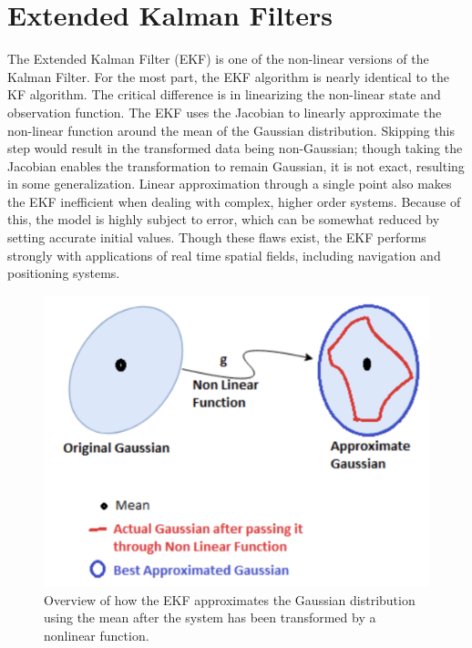 \chapter{Extended Kalman Filters}
\label{Extended Kalman Filters}

The Extended Kalman Filter (EKF) is one of the non-linear versions of the Kalman Filter. For the most part, the EKF algorithm is nearly identical to the KF algorithm. The critical difference is in linearizing the non-linear state and observation function. The EKF uses the Jacobian to linearly approximate the non-linear function around the mean of the Gaussian distribution. Skipping this step would result in the transformed data being non-Gaussian; though taking the Jacobian enables the transformation to remain Gaussian, it is not exact, resulting in some generalization. Linear approximation through a single point also makes the EKF inefficient when dealing with complex, higher order systems. Because of this, the model is highly subject to error, which can be somewhat reduced by setting accurate initial values. Though these flaws exist, the EKF performs strongly with applications of real time spatial fields, including navigation and positioning systems.  \\

 \begin{figure}[h]
    \centering
    \includegraphics[scale = 0.4]{EKF.png}
    \caption{Overview of how the EKF approximates the Gaussian distribution using the mean after the system has been transformed by a nonlinear function.}
    \end{figure}
    
